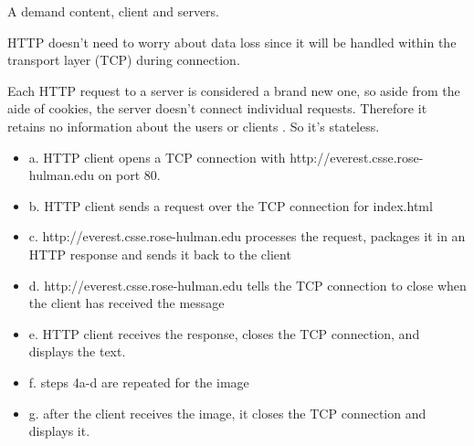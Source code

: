 \documentclass[12pt,letterpaper,boxed]{hmcpset}
\begin{document}
\begin{problem}
\end{problem}
A demand content, client and servers.


\begin{problem}
\end{problem}
HTTP doesn’t need to worry about data loss since it will be handled within the transport layer (TCP) during connection.


\begin{problem}
\end{problem}
Each HTTP request to a server is considered a brand new one, so aside from the aide of cookies, the server doesn’t connect individual requests. Therefore it retains no information about the users or clients . So it's stateless.

\begin{problem}
\end{problem}
\begin{itemize}
	\item a. HTTP client opens a TCP connection with http://everest.csse.rose-hulman.edu on port 80. 
    \item b. HTTP client sends a request over the TCP connection for index.html
    \item c. http://everest.csse.rose-hulman.edu processes the request, packages it in an HTTP response and sends it back to the client
    \item d. http://everest.csse.rose-hulman.edu tells the TCP connection to close when the client has received the message
    \item e. HTTP client receives the response, closes the TCP connection, and displays the text.
    \item f. steps 4a-d are repeated for the image
    \item g. after the client receives the image, it closes the TCP connection and displays it.
\end{itemize}
\end{document}

